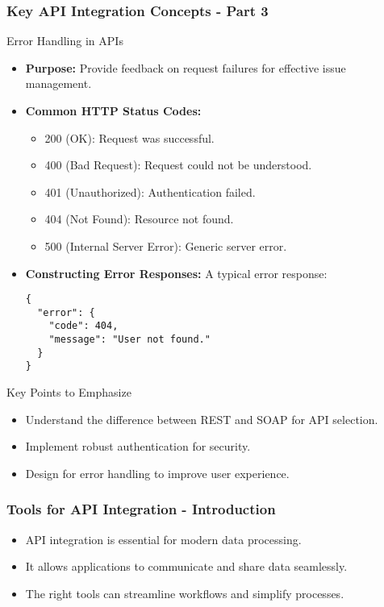 \documentclass[aspectratio=169]{beamer}
\begin{document}
\begin{frame}[fragile]
  \frametitle{Key API Integration Concepts - Part 3}
  \begin{block}{Error Handling in APIs}
    \begin{itemize}
      \item \textbf{Purpose:} Provide feedback on request failures for effective issue management.
      \item \textbf{Common HTTP Status Codes:}
        \begin{itemize}
          \item 200 (OK): Request was successful.
          \item 400 (Bad Request): Request could not be understood.
          \item 401 (Unauthorized): Authentication failed.
          \item 404 (Not Found): Resource not found.
          \item 500 (Internal Server Error): Generic server error.
        \end{itemize}
      \item \textbf{Constructing Error Responses:}
        A typical error response:
        \begin{lstlisting}
{
  "error": {
    "code": 404,
    "message": "User not found."
  }
}
        \end{lstlisting}
    \end{itemize}
  \end{block}

  \begin{block}{Key Points to Emphasize}
    \begin{itemize}
      \item Understand the difference between REST and SOAP for API selection.
      \item Implement robust authentication for security.
      \item Design for error handling to improve user experience.
    \end{itemize}
  \end{block}
\end{frame}

\begin{frame}[fragile]
    \frametitle{Tools for API Integration - Introduction}
    \begin{itemize}
        \item API integration is essential for modern data processing.
        \item It allows applications to communicate and share data seamlessly.
        \item The right tools can streamline workflows and simplify processes.
    \end{itemize}
\end{frame}
\end{document}
